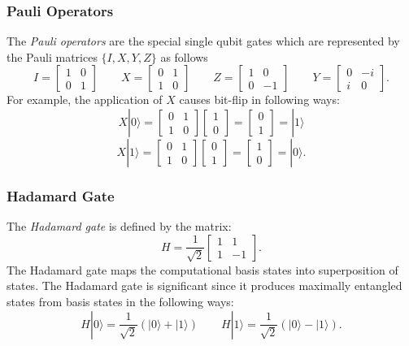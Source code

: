\documentclass[11pt]{article}
\newcommand{\ket}[1]{|#1\rangle}
\begin{document}
\subsubsection*{Pauli Operators}
	The \emph{Pauli operators} are the special single qubit gates which are represented by the Pauli matrices $\{I, X, Y, Z\}$ as follows
	\[
I =
\begin{bmatrix}
 1 & 0  \\
 0 & 1  
\end{bmatrix}
\qquad
X =
\begin{bmatrix}
 0 & 1  \\
 1 & 0  
\end{bmatrix}
\qquad
Z =
\begin{bmatrix}
 1 & 0  \\
 0 & -1  
\end{bmatrix}
\qquad
Y =
\begin{bmatrix}
 0 & -i  \\
 i & 0  
\end{bmatrix}.
\]
For example, the application of $X$ causes bit-flip in following ways:
\[
X\ket{0}=\begin{bmatrix}
 0 & 1  \\
 1 & 0  
\end{bmatrix}
\begin{bmatrix}
 1   \\
 0   
\end{bmatrix}=\begin{bmatrix}
 0   \\
 1   
\end{bmatrix}= \ket{1}
\]
\[
X\ket{1}=\begin{bmatrix}
 0 & 1  \\
 1 & 0  
\end{bmatrix}
\begin{bmatrix}
 0   \\
 1   
\end{bmatrix}=\begin{bmatrix}
 1   \\
 0   
\end{bmatrix}= \ket{0}.
\]
\subsubsection*{Hadamard Gate}
The \emph{Hadamard gate} is defined by the matrix:
\[
H= \frac{1}{\sqrt{2}}\begin{bmatrix}
 1 & 1  \\
 1 & -1
\end{bmatrix}.
\]
The Hadamard gate maps the computational basis states into superposition of states. The Hadamard gate is significant since it produces maximally entangled states from basis states in the following ways:
\[
H\ket{0}=\frac{1}{\sqrt{2}}(\ket{0}+\ket{1})
\qquad
H\ket{1}=\frac{1}{\sqrt{2}}(\ket{0}-\ket{1}).
\]
\end{document}
